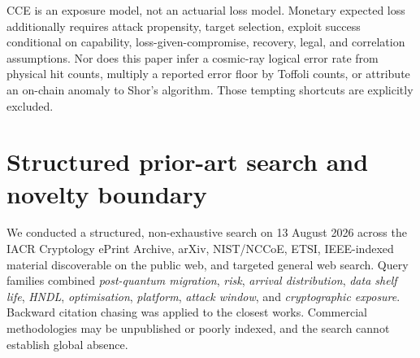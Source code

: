 \documentclass[10pt]{article}
\begin{document}
CCE is an exposure model, not an actuarial loss model. Monetary expected loss additionally requires attack propensity, target selection, exploit success conditional on capability, loss-given-compromise, recovery, legal, and correlation assumptions. Nor does this paper infer a cosmic-ray logical error rate from physical hit counts, multiply a reported error floor by Toffoli counts, or attribute an on-chain anomaly to Shor's algorithm. Those tempting shortcuts are explicitly excluded.

\section{Structured prior-art search and novelty boundary}

We conducted a structured, non-exhaustive search on 13 August 2026 across the IACR Cryptology ePrint Archive, arXiv, NIST/NCCoE, ETSI, IEEE-indexed material discoverable on the public web, and targeted general web search. Query families combined \emph{post-quantum migration}, \emph{risk}, \emph{arrival distribution}, \emph{data shelf life}, \emph{HNDL}, \emph{optimisation}, \emph{platform}, \emph{attack window}, and \emph{cryptographic exposure}. Backward citation chasing was applied to the closest works. Commercial methodologies may be unpublished or poorly indexed, and the search cannot establish global absence.
\end{document}
